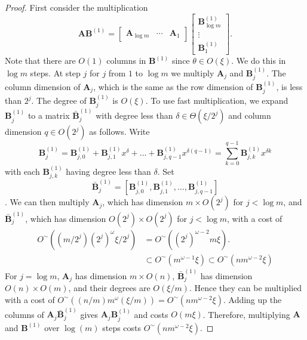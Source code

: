 \begin{proof}
First consider the multiplication 
\[
\mathbf{A}\mathbf{B}^{\left(1\right)}=\left[\begin{array}{ccc}
\mathbf{A}_{\log m} & \cdots & \mathbf{A}_{1}\end{array}\right]\left[\begin{array}{l}
\mathbf{B}_{\log m}^{\left(1\right)}\\
\vdots\\
\mathbf{B}_{1}^{\left(1\right)}
\end{array}\right].
\]
 Note that there are $O\left(1\right)$ columns in $\mathbf{B}^{(1)}$
since $\theta\in O\left(\xi\right)$. We do this in $\log m$ steps.
At step $j$ for $j$ from $1$ to $\log m$ we multiply $\mathbf{A}_{j}$
and $\mathbf{B}_{j}^{(1)}$. The column dimension of $\mathbf{A}_{j}$,
which is the same as the row dimension of $\mathbf{B}_{j}^{(1)}$,
is less than $2^{j}$. The degree of $\mathbf{B}_{j}^{(1)}$ is $O\left(\xi\right)$.
To use fast multiplication, we expand $\mathbf{B}_{j}^{(1)}$ to a
matrix $\bar{\mathbf{B}}_{j}^{(1)}$ with degree less than $\delta\in\Theta(\xi/2^{j})$
and column dimension $q\in O(2^{j})$ as follows. Write 
\[
\mathbf{B}_{j}^{(1)}=\mathbf{B}_{j,0}^{(1)}+\mathbf{B}_{j,1}^{(1)}x^{\delta}+\dots+\mathbf{B}_{j,q-1}^{(1)}x^{\delta(q-1)}=\sum_{k=0}^{q-1}\mathbf{B}_{j,k}^{(1)}x^{\delta k}
\]
 with each $\mathbf{B}_{j,k}^{(1)}$ having degree less than $\delta.$
Set 
\[
\bar{\mathbf{B}}_{j}^{(1)}=\left[\mathbf{B}_{j,0}^{(1)},\mathbf{B}_{j,1}^{(1)},\dots,\mathbf{B}_{j,q-1}^{(1)}\right]
\]
. We can then multiply $\mathbf{A}_{j}$, which has dimension $m\times O(2^{j})$
for $j<\log m$, and $\bar{\mathbf{B}}_{j}^{(1)}$, which has dimension
$O(2^{j})\times O(2^{j})$ for $j<\log m$, with a cost of 
\begin{align*}
O^{\sim}\left((m/2^{j})\left(2^{j}\right)^{\omega}\xi/2^{j}\right) & =O^{\sim}\left(\left(2^{j}\right)^{\omega-2}m\xi\right).\\
 & \subset O^{\sim}\left(m^{\omega-1}\xi\right)\subset O^{\sim}(nm^{\omega-2}\xi)
\end{align*}
 For $j=\log m$, $\mathbf{A}_{j}$ has dimension $m\times O\left(n\right)$,
$\bar{\mathbf{B}}_{j}^{\left(1\right)}$ has dimension $O\left(n\right)\times O(m)$,
and their degrees are $O\left(\xi/m\right)$. Hence they can be multiplied
with a cost of $O^{\sim}\left((n/m)m^{\omega}(\xi/m)\right)=O^{\sim}\left(nm^{\omega-2}\xi\right)$.
Adding up the columns of $\mathbf{A}_{j}\bar{\mathbf{B}}_{j}^{(1)}$
gives $\mathbf{A}_{j}\mathbf{B}_{j}^{(1)}$ and costs $O(m\xi)$.
Therefore, multiplying $\mathbf{A}$ and $\mathbf{B}^{(1)}$ over
$\log(m)$ steps costs $O^{\sim}\left(nm^{\omega-2}\xi\right)$.


\end{proof}
